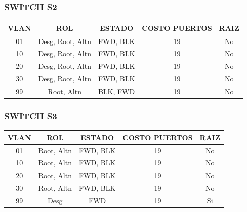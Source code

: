 \documentclass[letterpaper,12pt]{article}
\begin{document}
\begin{sloppypar}
\subsubsection{SWITCH S2}
\begin{center}
    \begin{tabular}{|c|c|c|c|c|} \hline
    VLAN & ROL & ESTADO & COSTO PUERTOS & RAIZ \\ \hline
    01 & Desg, Root, Altn & FWD, BLK & 19 & No  \\ \hline
    10 & Desg, Root, Altn & FWD, BLK & 19 & No \\ \hline 
    20 & Desg, Root, Altn & FWD, BLK & 19 & No \\ \hline
    30 & Desg, Root, Altn & FWD, BLK & 19 & No \\ \hline
    99 & Root, Altn & BLK, FWD & 19 & No \\ \hline
    \end{tabular}   
\end{center}

\subsubsection{SWITCH S3}
\begin{center}
    \begin{tabular}{|c|c|c|c|c|} \hline
    VLAN & ROL & ESTADO & COSTO PUERTOS & RAIZ \\ \hline
    01 & Root, Altn & FWD, BLK & 19 & No  \\ \hline
    10 & Root, Altn & FWD, BLK & 19 & No \\ \hline 
    20 & Root, Altn & FWD, BLK & 19 & No \\ \hline
    30 & Root, Altn & FWD, BLK & 19 & No \\ \hline
    99 & Desg & FWD & 19 & Si \\ \hline
    \end{tabular}   
\end{center}

\end{sloppypar}
\end{document}
